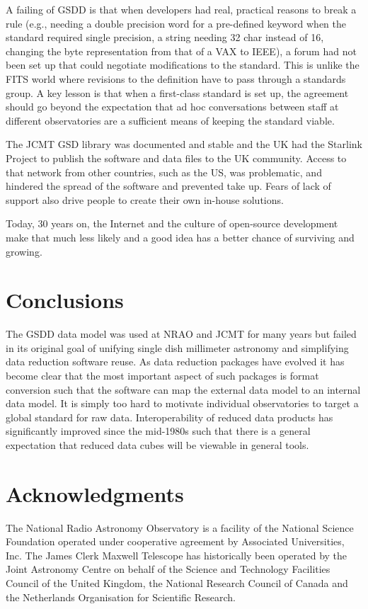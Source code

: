 \documentclass[final,authoryear,5p,times,twocolumn]{elsarticle}
\begin{document}
A failing of GSDD is that when developers had real, practical reasons
to break a rule (e.g., needing a double precision word for a
pre-defined keyword when the standard required single precision, a
string needing 32 char instead of 16, changing the byte representation
from that of a VAX to IEEE), a forum had not been set up that could
negotiate modifications to the standard.  This is unlike the FITS
world where revisions to the definition have to pass through a
standards group.  A key lesson is that when a first-class standard is
set up, the agreement should go beyond the expectation that ad hoc
conversations between staff at different observatories are a
sufficient means of keeping the standard viable.

The JCMT GSD library was documented and stable and the UK had the
Starlink Project \citep{1982QJRAS..23..485D} to publish the software
and data files to the UK community. Access to that network from other
countries, such as the US, was problematic, and hindered the spread of
the software and prevented take up. Fears of lack of support also
drive people to create their own in-house solutions.

Today, 30 years on, the Internet and the culture of open-source
development make that much less likely and a good idea has a better
chance of surviving and growing.

\section{Conclusions}

The GSDD data model was used at NRAO and JCMT for many years
but failed in its original goal of unifying single dish millimeter
astronomy and simplifying data reduction software reuse. As data
reduction packages have evolved it has become clear that the most
important aspect of such packages is format conversion such that the
software can map the external data model to an internal data model. It
is simply too hard to motivate individual observatories to target a
global standard for raw data. Interoperability of reduced data
products has significantly improved since the mid-1980s such that
there is a general expectation that reduced data cubes will be
viewable in general tools.


\section*{Acknowledgments}

The National Radio Astronomy Observatory is a facility of the National
Science Foundation operated under cooperative agreement by Associated
Universities, Inc.
The James Clerk Maxwell Telescope has historically been operated by
the Joint Astronomy Centre on behalf of the Science and Technology
Facilities Council of the United Kingdom, the National Research
Council of Canada and the Netherlands Organisation for Scientific
Research.
\end{document}
